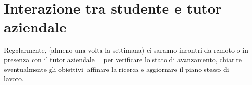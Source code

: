 \section*{Interazione tra studente e tutor aziendale}

Regolarmente, (almeno una volta la settimana) ci saranno incontri da remoto o in presenza con il tutor aziendale \nomeTutorAziendale\ \cognomeTutorAziendale\ per verificare lo stato di avanzamento, chiarire eventualmente gli obiettivi, affinare la ricerca e aggiornare il piano stesso di lavoro.